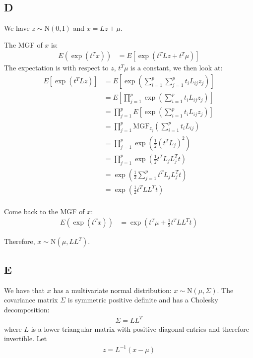 \documentclass{article}
\begin{document}
\subsection*{D}
We have \(z \sim \mbox{N}(0, \mbox{I})\) and \(x = Lz + \mu \).

\noindent
The MGF of \(x\) is:
\begin{align*}
E(\exp(t^Tx)) &= E[\exp(t^TLz + t^T\mu)]
\end{align*}
The expectation is with respect to \(z\), \(t^T\mu\) is a constant, we then look at:
\begin{align*}
E[\exp(t^TLz)] &= E\left[\exp\left(\sum_{i=1}^p \sum_{j=1}^p t_i L_{ij} z_j\right)\right]\\
&= E \left[ \prod_{j=1}^p \exp\left(\sum_{i=1}^p t_iL_{ij}z_j\right) \right]\\
&= \prod_{j=1}^p E \left[  \exp\left(\sum_{i=1}^p t_iL_{ij}z_j\right) \right] \tag{indepence}\\
&= \prod_{j=1}^p \mathrm{MGF}_{z_j}\left(\sum_{i=1}^p t_iL_{ij}\right) \\
&= \prod_{j=1}^p \exp\left(\frac{1}{2} (t^TL_j)^2 \right)\\
&= \prod_{j=1}^p \exp\left(\frac{1}{2} t^TL_jL_j^Tt \right)\\
&= \exp\left(\frac{1}{2}\sum_{j=1}^p t^TL_jL_j^Tt \right)\\
&= \exp\left(\frac{1}{2}t^TLL^Tt \right)\\
\end{align*}

\noindent
Come back to the MGF of \(x\):
\begin{align*}
E(\exp(t^Tx)) &= \exp \left(t^T\mu + \frac{1}{2}t^TLL^Tt \right)
\end{align*}

\noindent
Therefore, \(x \sim \mbox{N}(\mu, LL^T)\).

\subsection*{E}
We have that \(x\) has a multivariate normal distribution: \(x \sim \mbox{N}(\mu, \Sigma)\). The covariance matrix \(\Sigma\) is symmetric positive definite and has a Cholesky decomposition:
\begin{align*}
\Sigma = L L^T
\end{align*}
where \(L\) is a lower triangular matrix with positive diagonal entries and therefore invertible. Let
\begin{align*}
z = L^{-1}(x-\mu)
\end{align*}
\end{document}
